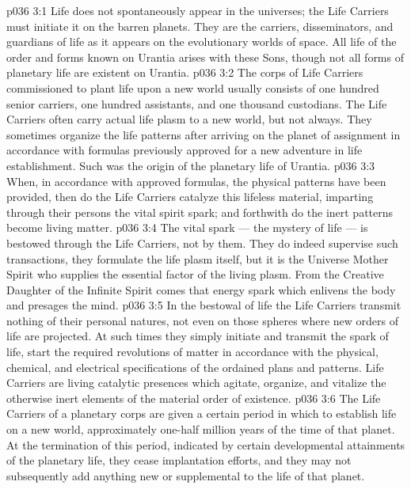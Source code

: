 \vs p036 3:1 Life does not spontaneously appear in the universes; the Life Carriers must initiate it on the barren planets. They are the carriers, disseminators, and guardians of life as it appears on the evolutionary worlds of space. All life of the order and forms known on Urantia arises with these Sons, though not all forms of planetary life are existent on Urantia.
\vs p036 3:2 The corps of Life Carriers commissioned to plant life upon a new world usually consists of one hundred senior carriers, one hundred assistants, and one thousand custodians. The Life Carriers often carry actual life plasm to a new world, but not always. They sometimes organize the life patterns after arriving on the planet of assignment in accordance with formulas previously approved for a new adventure in life establishment. Such was the origin of the planetary life of Urantia.
\vs p036 3:3 When, in accordance with approved formulas, the physical patterns have been provided, then do the Life Carriers catalyze this lifeless material, imparting through their persons the vital spirit spark; and forthwith do the inert patterns become living matter.
\vs p036 3:4 \pc The vital spark --- the mystery of life --- is bestowed through the Life Carriers, not by them. They do indeed supervise such transactions, they formulate the life plasm itself, but it is the Universe Mother Spirit who supplies the essential factor of the living plasm. From the Creative Daughter of the Infinite Spirit comes that energy spark which enlivens the body and presages the mind.
\vs p036 3:5 \pc In the bestowal of life the Life Carriers transmit nothing of their personal natures, not even on those spheres where new orders of life are projected. At such times they simply initiate and transmit the spark of life, start the required revolutions of matter in accordance with the physical, chemical, and electrical specifications of the ordained plans and patterns. Life Carriers are living catalytic presences which agitate, organize, and vitalize the otherwise inert elements of the material order of existence.
\vs p036 3:6 \pc The Life Carriers of a planetary corps are given a certain period in which to establish life on a new world, approximately one\hyp{}half million years of the time of that planet. At the termination of this period, indicated by certain developmental attainments of the planetary life, they cease implantation efforts, and they may not subsequently add anything new or supplemental to the life of that planet.
